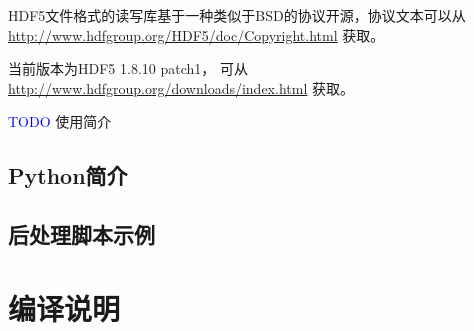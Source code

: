 \documentclass[master,xetex]{thuthesis}
\newcommand{\TODO}{ \textcolor{blue}{TODO} }
\begin{document}
\begin{appendix}
HDF5文件格式的读写库基于一种类似于BSD的协议开源，协议文本可以从
\url{http://www.hdfgroup.org/HDF5/doc/Copyright.html} 获取。

当前版本为HDF5 1.8.10 patch1，
可从\url{http://www.hdfgroup.org/downloads/index.html} 获取。

\TODO 使用简介

\subsection{Python简介}
\subsection{后处理脚本示例}
\section{编译说明}

\fi

%
\end{appendix}

%
\end{document}
